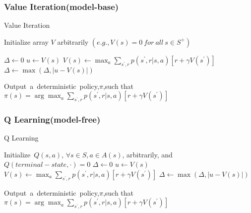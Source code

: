 \documentclass{article} %
\begin{document}
\begin{CJK*}{UTF8}{gkai}
\subsubsection{Value Iteration(model-base)}
\begin{algorithm}
    \caption{Value Iteration}
    \label{alg2}
    \begin{algorithmic}[1]
        \STATE  Initialize array $V$ arbitrarily $\left(e.g.,V\left(s\right)=0\ for\ all\ s\in S ^{+}\right)$

        \REPEAT  
            \STATE $\Delta \gets 0$
                \STATE $u \gets V\left(s\right)$
                \STATE $V\left(s\right) \gets \max _{a}\sum _{s ^{\prime},r}p\left(s ^{\prime},r \vert s,a\right)\left[r+\gamma V\left(s ^{\prime}\right) \right]$
                \STATE $\Delta \gets \max\left(\Delta,\vert u - V\left(s\right)\vert\right)$
            \ENDFOR

        \STATE Output\ a\ deterministic\ policy,$\pi$,such that
        \STATE $\pi\left(s\right) = \arg\max _{a}\sum _{s ^{\prime},r}p\left(s ^{\prime},r \vert s,a\right)\left[r+\gamma V\left(s ^{\prime}\right) \right]$
    \end{algorithmic}
\end{algorithm}

\subsubsection{Q Learning(model-free)}
\begin{algorithm}
    \caption{Q Learning}
    \label{alg3}
    \begin{algorithmic}[1]
        \STATE  Initialize\ $Q\left(s,a\right)$, $\forall s\in S,a\in A\left(s\right)$, arbitrarily, and$Q\left(terminal-state,\cdot\right)=0$
        \REPEAT
            \STATE $\Delta \gets 0$
                \STATE $u \gets V\left(s\right)$
                \STATE $V\left(s\right) \gets \max _{a}\sum _{s ^{\prime},r}p\left(s ^{\prime},r \vert s,a\right)\left[r+\gamma V\left(s ^{\prime}\right) \right]$
                \STATE $\Delta \gets \max\left(\Delta,\vert u - V\left(s\right)\vert\right)$
            \ENDFOR

        \STATE Output\ a\ deterministic\ policy,$\pi$,such that
        \STATE $\pi\left(s\right) = \arg\max _{a}\sum _{s ^{\prime},r}p\left(s ^{\prime},r \vert s,a\right)\left[r+\gamma V\left(s ^{\prime}\right) \right]$
    \end{algorithmic}
\end{algorithm}

\end{CJK*}
\end{document}
